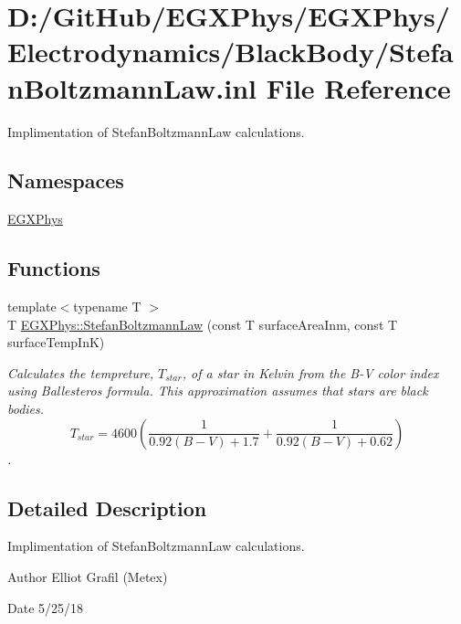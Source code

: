 \hypertarget{_stefan_boltzmann_law_8inl}{}\section{D\+:/\+Git\+Hub/\+E\+G\+X\+Phys/\+E\+G\+X\+Phys/\+Electrodynamics/\+Black\+Body/\+Stefan\+Boltzmann\+Law.inl File Reference}
\label{_stefan_boltzmann_law_8inl}


Implimentation of Stefan\+Boltzmann\+Law calculations.  


\subsection*{Namespaces}
\begin{DoxyCompactItemize}
\item 
 \mbox{\hyperlink{namespace_e_g_x_phys}{E\+G\+X\+Phys}}
\end{DoxyCompactItemize}
\subsection*{Functions}
\begin{DoxyCompactItemize}
\item 
{\footnotesize template$<$typename T $>$ }\\T \mbox{\hyperlink{group___e_g_x_phys-_electrodynamics-_black_body-_stefan_boltzmann_law_ga1672439c53b17cdad6cf7b30b94c53d4}{E\+G\+X\+Phys\+::\+Stefan\+Boltzmann\+Law}} (const T surface\+Area\+Inm, const T surface\+Temp\+InK)
\begin{DoxyCompactList}\small\item\em Calculates the tempreture, $T_{star}$, of a star in Kelvin from the B-\/V color index using Ballesteros\textquotesingle{} formula. This approximation assumes that stars are black bodies. \[T_{star}=4600 \left ( \frac{1}{0.92 (B-V)+ 1.7} + \frac{1}{0.92 (B-V) + 0.62} \right )\]. \end{DoxyCompactList}\end{DoxyCompactItemize}


\subsection{Detailed Description}
Implimentation of Stefan\+Boltzmann\+Law calculations. 

\begin{DoxyAuthor}{Author}
Elliot Grafil (Metex) 
\end{DoxyAuthor}
\begin{DoxyDate}{Date}
5/25/18 
\end{DoxyDate}
